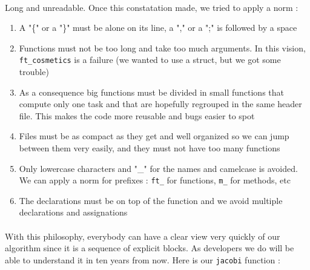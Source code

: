 \documentclass[a4paper, twoside, 11pt]{report}
\theoremstyle{theorem}
\theoremstyle{remark}
\theoremstyle{exemple}
\begin{document}
		\paragraph{}Long and unreadable. Once this constatation made, we tried to apply a norm :
			\begin{enumerate}
			\setlength\itemsep{0em}

				\item{A "\{" or a "\}" must be alone on its line, a "," or a ";" is followed by a space}
				\item{Functions must not be too long and take too much arguments. In this vision, \texttt{ft\_cosmetics} is a failure (we wanted to use a struct, but we got some trouble)}
				\item{As a consequence big functions must be divided in small functions that compute only one task and that are hopefully regrouped in the same header file. This makes the code more reusable and bugs easier to spot}
				\item{Files must be as compact as they get and well organized so we can jump between them very easily, and they must not have too many functions}
				\item{Only lowercase characters and "\_" for the names and camelcase is avoided. We can apply a norm for prefixes : \texttt{ft\_} for functions, \texttt{m\_} for methods, etc}
				\item{The declarations must be on top of the function and we avoid multiple declarations and assignations}
			\end{enumerate}
			
		\paragraph{}With this philosophy, everybody can have a clear view very quickly of our algorithm since it is a sequence of explicit blocks. As developers we do will be able to understand it in ten years from now. Here is our \texttt{jacobi} function : 
		
\end{document}
